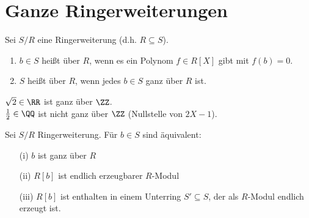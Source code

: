 \section{Ganze Ringerweiterungen}

\begin{Def} 
  Sei $S/R$ eine Ringerweiterung (d.h. $R \subseteq S$).
  \begin{enumerate} 
    \item $b \in S$ heißt  über $R$, wenn es ein 
          Polynom $f \in R[X]$ gibt mit $f(b) = 0$.
    \item $S$ heißt  über $R$, wenn jedes
    $b \in S$ ganz über $R$ ist.
\end{enumerate}
\end{Def}

\begin{nnBsp} 
  $\sqrt{2} \in \RR$ ist ganz über $\ZZ$.\\
  $\frac{1}{2} \in \QQ$ ist nicht ganz über $\ZZ$ (Nullstelle von
  $2X -1$).
\end{nnBsp}

\begin{Prop}
\label{2.7}
  Sei $S/R$ Ringerweiterung. Für $b \in S$ sind äquivalent:
  \begin{enumerate} 
    \item[(i)] $b$ ist ganz über $R$
    \item[(ii)] $R[b]$ ist endlich erzeugbarer $R$-Modul
    \item[(iii)] $R[b]$ ist enthalten in einem Unterring $S' \subseteq S$, der
                 als $R$-Modul endlich erzeugt ist.
\end{enumerate}
\end{Prop}

